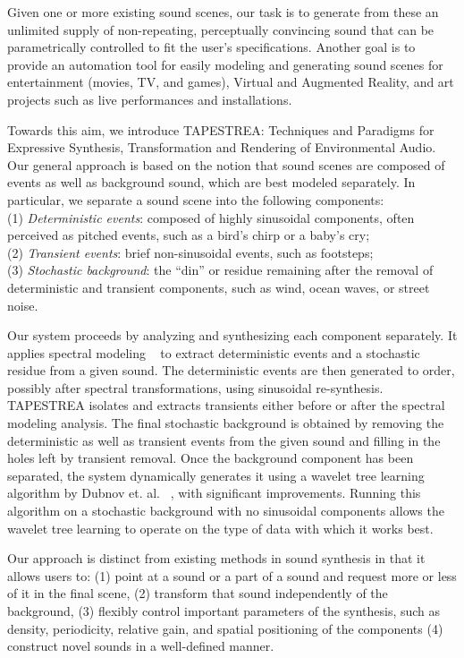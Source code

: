 \documentclass[review]{acmsiggraph}      %
\begin{document}
Given one or more existing sound scenes, our task is to generate from 
these an unlimited supply of non-repeating, perceptually convincing 
sound that can be parametrically controlled to fit the user's 
specifications. Another goal is to provide an automation tool for 
easily modeling and generating sound scenes for 
entertainment (movies, TV, and games), Virtual and Augmented Reality, 
and art projects such as live performances and installations.

Towards this aim, we introduce TAPESTREA: Techniques and Paradigms for 
Expressive Synthesis, Transformation and Rendering of Environmental 
Audio. Our general approach is based on the notion that sound scenes are 
composed of events as well as background sound, which are best modeled 
separately. In particular, we separate a sound scene into the following 
components:\\
(1) \emph{Deterministic events}: composed of highly sinusoidal components, 
often perceived as pitched events, such as a bird's chirp or a baby's cry;\\
(2) \emph{Transient events}: brief non-sinusoidal events, such as footsteps;\\
(3) \emph{Stochastic background}: the ``din'' or residue remaining after the 
removal of deterministic and transient components, such as wind, ocean waves, or 
street noise.

Our system proceeds by analyzing and synthesizing each component separately. It  
applies spectral modeling ~\cite{Serra89} to extract deterministic events 
and a stochastic residue from a given sound. The deterministic events are 
then generated to order, possibly after spectral transformations, using 
sinusoidal re-synthesis. TAPESTREA isolates and extracts transients either before or 
after the spectral modeling analysis. The final stochastic background is 
obtained by removing the deterministic as well as transient events 
from the given sound and filling in the holes left by transient removal. 
Once the background component has been separated, the system dynamically 
generates it using a wavelet tree learning algorithm by Dubnov et. al. 
~, with significant improvements. Running this algorithm 
on a stochastic background with no sinusoidal components allows the wavelet 
tree learning to operate on the type of data with which it works best.  

Our approach is distinct from existing methods in sound synthesis in that it allows users to:
(1) point at a sound or a part of a sound and request more or less of it in the final scene,
(2) transform that sound independently of the background,
(3) flexibly control important parameters of the synthesis, such as density, periodicity, relative gain, and spatial positioning of the components
(4) construct novel sounds in a well-defined manner.
\end{document}
